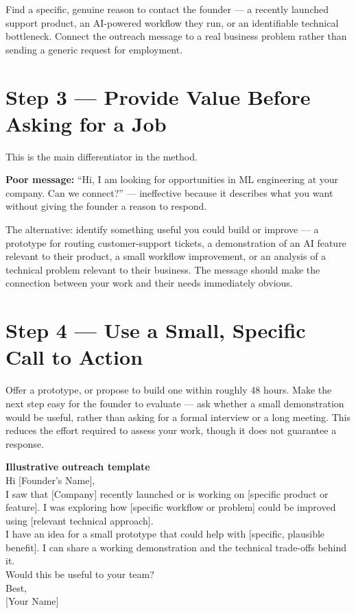 Find a specific, genuine reason to contact the founder --- a recently launched support product, an AI-powered
workflow they run, or an identifiable technical bottleneck. Connect the outreach message to a real business
problem rather than sending a generic request for employment.

\section{Step 3 --- Provide Value Before Asking for a Job}

This is the main differentiator in the method.

\begin{example}
\bad \textbf{Poor message:} ``Hi, I am looking for opportunities in ML engineering at your company. Can we
connect?'' --- ineffective because it describes what you want without giving the founder a reason to respond.
\end{example}

The alternative: identify something useful you could build or improve --- a prototype for routing customer-support
tickets, a demonstration of an AI feature relevant to their product, a small workflow improvement, or an analysis
of a technical problem relevant to their business. The message should make the connection between your work and
their needs immediately obvious.

\section{Step 4 --- Use a Small, Specific Call to Action}

Offer a prototype, or propose to build one within roughly 48 hours. Make the next step easy for the founder to
evaluate --- ask whether a small demonstration would be useful, rather than asking for a formal interview or a
long meeting. This reduces the effort required to assess your work, though it does not guarantee a response.

\begin{template}
\textbf{Illustrative outreach template}\\[4pt]
Hi [Founder's Name],\\[2pt]
I saw that [Company] recently launched or is working on [specific product or feature]. I was exploring how
[specific workflow or problem] could be improved using [relevant technical approach].\\[2pt]
I have an idea for a small prototype that could help with [specific, plausible benefit]. I can share a working
demonstration and the technical trade-offs behind it.\\[2pt]
Would this be useful to your team?\\[2pt]
Best,\\{}
[Your Name]
\end{template}

